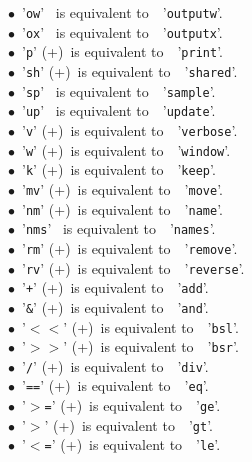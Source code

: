 \documentclass[a4paper,10.5pt,twoside]{book}
\newcommand{\Ca}[1]{\textcolor{ca}{#1}}
\begin{document}
$\bullet$~'\texttt{\Ca{ow}}' ~is equivalent to~~'\texttt{\Ca{outputw}}'.\\
$\bullet$~'\texttt{\Ca{ox}}' ~is equivalent to~~'\texttt{\Ca{outputx}}'.\\
$\bullet$~'\texttt{\Ca{p}}' (+)~is equivalent to~~'\texttt{\Ca{print}}'.\\
$\bullet$~'\texttt{\Ca{sh}}' (+)~is equivalent to~~'\texttt{\Ca{shared}}'.\\
$\bullet$~'\texttt{\Ca{sp}}' ~is equivalent to~~'\texttt{\Ca{sample}}'.\\
$\bullet$~'\texttt{\Ca{up}}' ~is equivalent to~~'\texttt{\Ca{update}}'.\\
$\bullet$~'\texttt{\Ca{v}}' (+)~is equivalent to~~'\texttt{\Ca{verbose}}'.\\
$\bullet$~'\texttt{\Ca{w}}' (+)~is equivalent to~~'\texttt{\Ca{window}}'.\\
$\bullet$~'\texttt{\Ca{k}}' (+)~is equivalent to~~'\texttt{\Ca{keep}}'.\\
$\bullet$~'\texttt{\Ca{mv}}' (+)~is equivalent to~~'\texttt{\Ca{move}}'.\\
$\bullet$~'\texttt{\Ca{nm}}' (+)~is equivalent to~~'\texttt{\Ca{name}}'.\\
$\bullet$~'\texttt{\Ca{nms}}' ~is equivalent to~~'\texttt{\Ca{names}}'.\\
$\bullet$~'\texttt{\Ca{rm}}' (+)~is equivalent to~~'\texttt{\Ca{remove}}'.\\
$\bullet$~'\texttt{\Ca{rv}}' (+)~is equivalent to~~'\texttt{\Ca{reverse}}'.\\
$\bullet$~'\texttt{\Ca{+}}' (+)~is equivalent to~~'\texttt{\Ca{add}}'.\\
$\bullet$~'\texttt{\Ca{\&}}' (+)~is equivalent to~~'\texttt{\Ca{and}}'.\\
$\bullet$~'\texttt{\Ca{$<$$<$}}' (+)~is equivalent to~~'\texttt{\Ca{bsl}}'.\\
$\bullet$~'\texttt{\Ca{$>$$>$}}' (+)~is equivalent to~~'\texttt{\Ca{bsr}}'.\\
$\bullet$~'\texttt{\Ca{/}}' (+)~is equivalent to~~'\texttt{\Ca{div}}'.\\
$\bullet$~'\texttt{\Ca{==}}' (+)~is equivalent to~~'\texttt{\Ca{eq}}'.\\
$\bullet$~'\texttt{\Ca{$>$=}}' (+)~is equivalent to~~'\texttt{\Ca{ge}}'.\\
$\bullet$~'\texttt{\Ca{$>$}}' (+)~is equivalent to~~'\texttt{\Ca{gt}}'.\\
$\bullet$~'\texttt{\Ca{$<$=}}' (+)~is equivalent to~~'\texttt{\Ca{le}}'.\\
\end{document}
